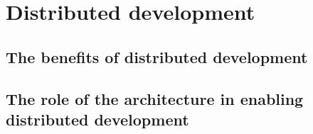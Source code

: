 \section{Distributed development}
    \subsection{The benefits of distributed development}
    \subsection{The role of the architecture in enabling distributed development}
